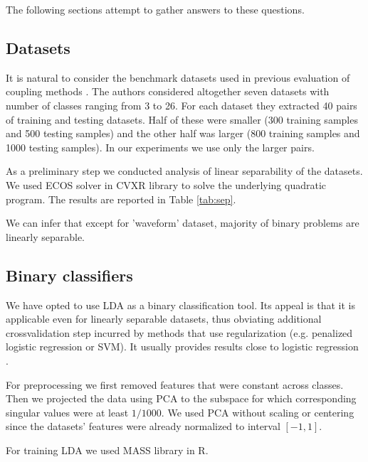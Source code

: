\documentclass[twoside,11pt]{article}
\begin{document}
The following sections attempt to gather answers to these questions. 

\subsection{Datasets}

It is natural to consider the benchmark datasets used in previous evaluation of coupling methods \cite{wu2004probability}. The authors considered altogether seven datasets with number of classes ranging from 3 to 26. For each dataset they extracted 40 pairs of training and testing datasets. Half of these were smaller (300 training samples and 500 testing samples) and the other half was larger (800 training samples and 1000 testing samples). In our experiments we use only the larger pairs. 

As a preliminary step we conducted analysis of linear separability of the datasets. We used ECOS solver in CVXR library to solve the underlying quadratic program. The results are reported in Table \ref{tab:sep}.



We can infer that except for 'waveform' dataset, majority of binary problems are linearly separable.

\subsection{Binary classifiers}

We have opted to use LDA as a binary classification tool. Its appeal is that it is applicable even for linearly separable datasets, thus obviating additional crossvalidation step incurred by methods that use regularization (e.g. penalized logistic regression or SVM). It usually provides results close to logistic regression \cite{james2013introduction}.

For preprocessing we first removed features that were constant across classes. Then we projected the data using PCA to the subspace for which corresponding singular values were at least $1/1000$. We used PCA without scaling or centering since the datasets' features were already normalized to interval $[-1,1]$. 

For training LDA we used MASS library in R.

\end{document}
